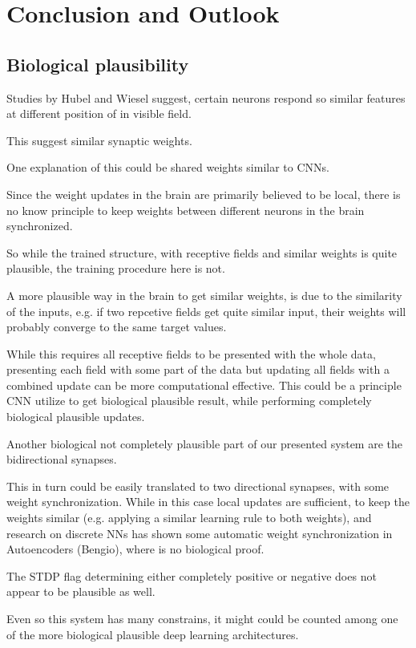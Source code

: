 \chapter{Conclusion and Outlook}

\section{Biological plausibility}

Studies by Hubel and Wiesel suggest, certain neurons respond so similar features at different position of in visible field.

This suggest similar synaptic weights. 

One explanation of this could be shared weights similar to CNNs. 

Since the weight updates in the brain are primarily believed to be local, there is no know principle to keep weights between different neurons in the brain synchronized.

So while the trained structure, with receptive fields and similar weights is quite plausible, the training procedure here is not.

A more plausible way in the brain to get similar weights, is due to the similarity of the inputs, e.g. if two repcetive fields get quite similar input, their weights will probably converge to the same target values.  

While this requires all receptive fields to be presented with the whole data, presenting each field with some part of the data but updating all fields with a combined update can be more computational effective. 
This could be a principle CNN utilize to get biological plausible result, while performing completely biological plausible updates.

Another biological not completely plausible part of our presented system are the bidirectional synapses.

This in turn could be easily translated to two directional synapses, with some weight synchronization. While in this case local updates are sufficient, to keep the weights similar (e.g. applying a similar learning rule to both weights), and research on discrete NNs has shown some automatic weight synchronization in Autoencoders (Bengio), where is no biological proof.

The STDP flag determining either completely positive or negative does not appear to be plausible as well.

Even so this system has many constrains, it might could be counted among one of the more biological plausible deep learning architectures.     




 